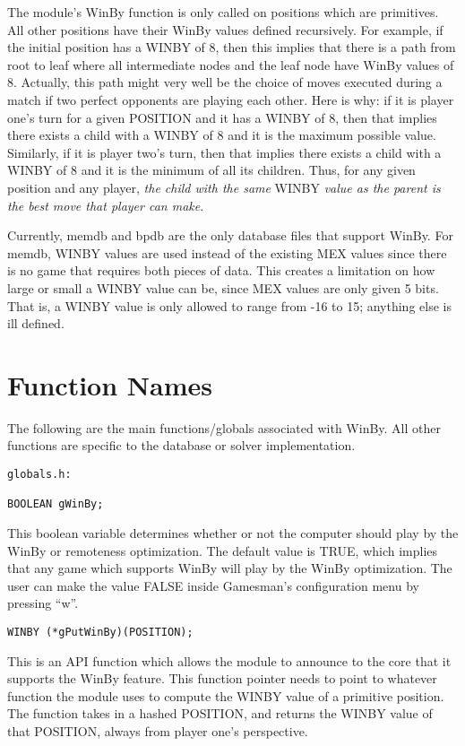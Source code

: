 \documentclass[pdftex]{article}
\begin{document}
The module's WinBy function is only called on positions which are primitives.  All
other positions have their WinBy values defined recursively.  For example, if
the initial position has a WINBY of 8, then this implies that there is a path
from root to leaf where all intermediate nodes and the leaf node have WinBy values of 8.
Actually, this path might very well be the choice of moves executed during a match if
two perfect opponents are playing each other.  Here is why: if it is player one's turn
for a given POSITION and it has a WINBY of 8, then that implies there exists a child
with a WINBY of 8 and it is the maximum possible value.  Similarly, if it is player two's
turn, then that implies there exists a child with a WINBY of 8 and it is the minimum
of all its children.  Thus, for any given position and any player, \emph{the child
with the same} WINBY \emph{value as the parent is the best move that player can make}.

Currently, memdb and bpdb are the only database files that support WinBy.  For memdb,
WINBY values are used instead of the existing MEX values since there is no game that
requires both pieces of data.  This creates a limitation on how large or small a WINBY
value can be, since MEX values are only given 5 bits.  That is, a WINBY value is only
allowed to range from -16 to 15; anything else is ill defined.

\section{Function Names}

\indent \indent The following are the main functions/globals associated with WinBy.  All other
functions are specific to the database or solver implementation.

\begin{verbatim}
globals.h:

BOOLEAN gWinBy;
\end{verbatim}
This boolean variable determines whether or not the computer should play by the WinBy or
remoteness optimization.  The default value is TRUE, which implies that any game which
supports WinBy will play by the WinBy optimization.  The user can make the value FALSE
inside Gamesman's configuration menu by pressing ``w''.

\begin{verbatim}
WINBY (*gPutWinBy)(POSITION);
\end{verbatim}
This is an API function which allows the module to announce to the core that it supports
the WinBy feature.  This function pointer needs to point to whatever function the
module uses to compute the WINBY value of a primitive position.  The function takes in
a hashed POSITION, and returns the WINBY value of that POSITION, always from player
one's perspective.
\end{document}
